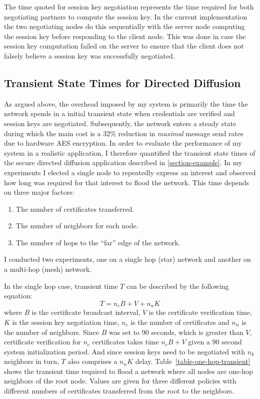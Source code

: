 The time quoted for session key negotiation represents the time required for both negotiating
partners to compute the session key. In the current implementation the two negotiating nodes do
this sequentially with the server node computing the session key before responding to the client
node. This was done in case the session key computation failed on the server to ensure that the
client does not falsely believe a session key was successfully negotiated.

\subsection{Transient State Times for Directed Diffusion}

As argued above, the overhead imposed by my system is primarily the time the network spends in a
initial transient state when credentials are verified and session keys are negotiated.
Subsequently, the network enters a steady state during which the main cost is a 32\% reduction
in \emph{maximal} message send rates due to hardware AES encryption. In order to evaluate the
performance of my system in a realistic application, I therefore quantified the transient state
times of the secure directed diffusion application described in \autoref{section-example}. In my
experiments I elected a single node to repeatedly express an interest and observed how long was
required for that interest to flood the network. This time depends on three major factors:
\begin{enumerate}
\item The number of certificates transferred.
\item The number of neighbors for each node.
\item The number of hops to the ``far'' edge of the network.
\end{enumerate}
I conducted two experiments, one on a single hop (star) network and another on a multi-hop
(mesh) network.

In the single hop case, transient time $T$ can be described by the following equation:
\begin{displaymath}
T = n_c B + V + n_n K
\end{displaymath}
where $B$ is the certificate broadcast interval, $V$ is the certificate verification time, $K$
is the session key negotiation time, $n_c$ is the number of certificates and $n_n$ is the number
of neighbors. Since $B$ was set to 90 seconds, which is greater than $V$, certificate
verification for $n_c$ certificates takes time $n_c B + V$ given a 90 second system
initialization period. And since session keys need to be negotiated with $n_k$ neighbors in
turn, $T$ also comprises a $n_nK$ delay. Table~\ref{table-one-hop-transient} shows the transient
time required to flood a network where all nodes are one-hop neighbors of the root node. Values
are given for three different policies with different numbers of certificates transferred from
the root to the neighbors.

